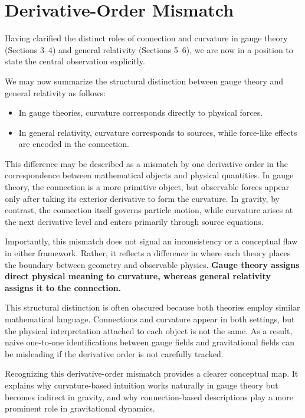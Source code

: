 \documentclass[12pt,letterpaper]{article} %
\begin{document}
\section{Derivative-Order Mismatch}

\justifying
Having clarified the distinct roles of connection and curvature in gauge theory (Sections 3--4) and general relativity (Sections 5--6), we are now in a position to state the central observation explicitly.

We may now summarize the structural distinction between gauge theory and general relativity as follows:
\begin{itemize}
\item In gauge theories, curvature corresponds directly to physical forces.
\item In general relativity, curvature corresponds to sources, while force-like effects are encoded in the connection.
\end{itemize}

This difference may be described as a mismatch by one derivative order in the correspondence between mathematical objects and physical quantities. In gauge theory, the connection is a more primitive object, but observable forces appear only after taking its exterior derivative to form the curvature. In gravity, by contrast, the connection itself governs particle motion, while curvature arises at the next derivative level and enters primarily through source equations.

Importantly, this mismatch does not signal an inconsistency or a conceptual flaw in either framework.  
Rather, it reflects a difference in where each theory places the boundary between geometry and observable physics. \textbf{Gauge theory assigns direct physical meaning to curvature, whereas general relativity assigns it to the connection.}

This structural distinction is often obscured because both theories employ similar mathematical language.  
Connections and curvature appear in both settings, but the physical interpretation attached to each object is not the same. As a result, naive one-to-one identifications between gauge fields and gravitational fields can be misleading if the derivative order is not carefully tracked.

Recognizing this derivative-order mismatch provides a clearer conceptual map. It explains why curvature-based intuition works naturally in gauge theory but becomes indirect in gravity, and why connection-based descriptions play a more prominent role in gravitational dynamics.
\end{document}

